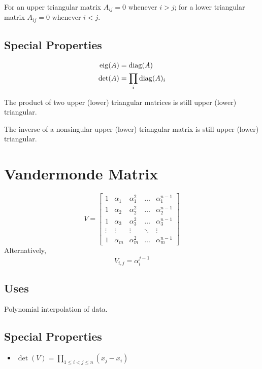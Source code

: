 For an upper triangular matrix $A_{ij}=0$ whenever $i>j$; for a lower triangular matrix $A_{ij}=0$ whenever $i<j$.


\subsection*{Special Properties}

\begin{align}
\operatorname{eig}(A) &= \operatorname{diag}(A)             \\
\det(A) &= \prod_i \operatorname{diag}(A)_i
\end{align}

The product of two upper (lower) triangular matrices is still upper (lower) triangular.

The inverse of a nonsingular upper (lower) triangular matrix is still upper (lower) triangular.




\section{Vandermonde Matrix}
\begin{equation}
V=
\begin{bmatrix}
1      & \alpha_1 & \alpha_1^2 & \dots  & \alpha_1^{n-1} \\
1      & \alpha_2 & \alpha_2^2 & \dots  & \alpha_2^{n-1} \\
1      & \alpha_3 & \alpha_3^2 & \dots  & \alpha_3^{n-1} \\
\vdots & \vdots   & \vdots     & \ddots & \vdots         \\
1      & \alpha_m & \alpha_m^2 & \dots  & \alpha_m^{n-1}
\end{bmatrix}
\end{equation}
Alternatively,
\begin{equation}
V_{i,j} = \alpha_i^{j-1}
\end{equation}

\subsection*{Uses}
Polynomial interpolation of data.

\subsection*{Special Properties}
\begin{itemize}
\item $\det(V)=\prod_{1\le i < j \le n} (x_j-x_i)$
\end{itemize}